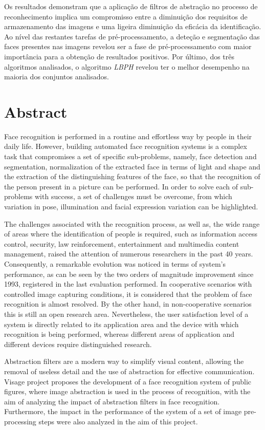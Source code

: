 Os resultados demonstram que a aplicação de filtros de abstração no processo de reconhecimento implica um compromisso entre a diminuição dos requisitos de armazenamento das imagens e uma ligeira diminuição da eficácia da identificação. Ao nível das restantes tarefas de pré-processamento, a deteção e segmentação das faces presentes nas imagens revelou ser a fase de pré-processamento com maior importância para a obtenção de resultados positivos. Por último, dos três algoritmos analisados, o algoritmo \textit{LBPH} revelou ter o melhor desempenho na maioria dos conjuntos analisados.

\chapter*{Abstract}
Face recognition is performed in a routine and effortless way by people in their daily life. However, building automated face recognition systems is a complex task that compromises a set of specific sub-problems, namely, face detection and segmentation, normalization of the extracted face in terms of light and shape and the extraction of the distinguishing features of the face, so that the recognition of the person present in a picture can be performed. In order to solve each of sub-problems with success, a set of challenges must be overcome, from which variation in pose, illumination and facial expression variation can be highlighted.

The challenges associated with the recognition process, as well as, the wide range of areas where the identification of people is required, such as information access control, security, law reinforcement, entertainment and multimedia content management, raised the attention of numerous researchers in the past 40 years. Consequently, a remarkable evolution was noticed in terms of system's performance, as can be seen by the two orders of magnitude improvement since 1993, registered in the last evaluation performed. In cooperative scenarios with controlled image capturing conditions, it is considered that the problem of face recognition is almost resolved. By the other hand,  in non-cooperative scenarios this is still an open research area. Nevertheless, the user satisfaction level of a system is directly related to its application area and the device with which recognition is being performed, whereas different areas of application and different devices require distinguished research.

Abstraction filters are a modern way to simplify visual content, allowing the removal of useless detail and the use of abstraction for effective communication. Visage project proposes the development of a face recognition system of public figures, where image abstraction is used in the process of recognition, with the aim of analyzing the impact of abstraction filters in face recognition. Furthermore, the impact in the performance of the system of a set of image pre-processing steps were also analyzed in the aim of this project.

